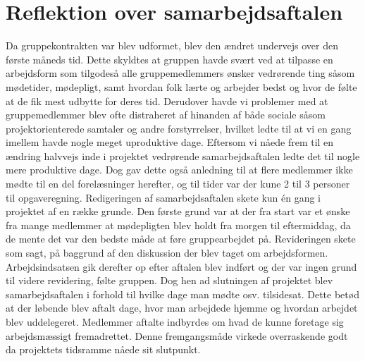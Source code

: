 \section{Reflektion over samarbejdsaftalen}\label{Reflektion-over-samarbejdsaftale}
Da gruppekontrakten var blev udformet, blev den ændret undervejs over den første måneds tid. Dette skyldtes at gruppen havde svært ved at tilpasse en arbejdsform som tilgodeså alle gruppemedlemmers ønsker vedrørende ting såsom mødetider, mødepligt, samt hvordan folk lærte og arbejder bedst og hvor de følte at de fik mest udbytte for deres tid. Derudover havde vi problemer med at gruppemedlemmer blev ofte distraheret af hinanden af både sociale såsom projektorienterede samtaler og andre forstyrrelser, hvilket ledte til at vi en gang imellem havde nogle meget uproduktive dage. Eftersom vi nåede frem til en ændring halvvejs inde i projektet vedrørende samarbejdsaftalen ledte det til nogle mere produktive dage. Dog gav dette også anledning til at flere medlemmer ikke mødte til en del forelæsninger herefter, og til tider var der kune 2 til 3 personer til opgaveregning. Redigeringen af samarbejdsaftalen skete kun én gang i projektet af en række grunde. Den første grund var at der fra start var et ønske fra mange medlemmer at mødepligten blev holdt fra morgen til eftermiddag, da de mente det var den bedste måde at føre gruppearbejdet på. Revideringen skete som sagt, på baggrund af den diskussion der blev taget om arbejdsformen. Arbejdsindsatsen gik derefter op efter aftalen blev indført og der var ingen grund til videre revidering, følte gruppen. Dog hen ad slutningen af projektet blev samarbejdsaftalen i forhold til hvilke dage man mødte osv. tilsidesat. Dette betød at der løbende blev aftalt dage, hvor man arbejdede hjemme og hvordan arbejdet blev uddelegeret. Medlemmer aftalte indbyrdes om hvad de kunne foretage sig arbejdsmæssigt fremadrettet. Denne fremgangsmåde virkede overraskende godt da projektets tidsramme nåede sit slutpunkt.